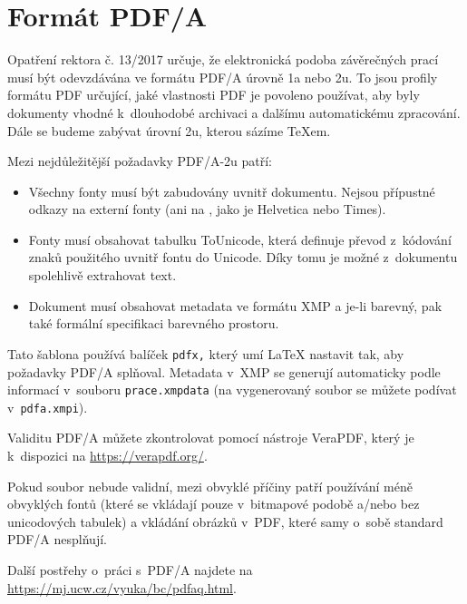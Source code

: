 
\chapter{Formát PDF/A}

Opatření rektora č. 13/2017 určuje, že elektronická podoba závěrečných
prací musí být odevzdávána ve formátu PDF/A úrovně 1a nebo 2u. To jsou
profily formátu PDF určující, jaké vlastnosti PDF je povoleno používat,
aby byly dokumenty vhodné k~dlouhodobé archivaci a dalšímu automatickému
zpracování. Dále se budeme zabývat úrovní 2u, kterou sázíme \TeX{}em.

Mezi nejdůležitější požadavky PDF/A-2u patří:

\begin{itemize}

\item Všechny fonty musí být zabudovány uvnitř dokumentu. Nejsou přípustné
odkazy na externí fonty (ani na , jako je Helvetica nebo Times).

\item Fonty musí obsahovat tabulku ToUnicode, která definuje převod z~kódování
znaků použitého uvnitř fontu do Unicode. Díky tomu je možné z~dokumentu
spolehlivě extrahovat text.

\item Dokument musí obsahovat metadata ve formátu XMP a je-li barevný,
pak také formální specifikaci barevného prostoru.

\end{itemize}

Tato šablona používá balíček {\tt pdfx,} který umí \LaTeX{} nastavit tak,
aby požadavky PDF/A splňoval. Metadata v~XMP se generují automaticky podle
informací v~souboru {\tt prace.xmpdata} (na vygenerovaný soubor se můžete
podívat v~{\tt pdfa.xmpi}).

Validitu PDF/A můžete zkontrolovat pomocí nástroje VeraPDF, který je
k~dispozici na \url{https://verapdf.org/}.

Pokud soubor nebude validní, mezi obvyklé příčiny patří používání méně
obvyklých fontů (které se vkládají pouze v~bitmapové podobě a/nebo bez
unicodových tabulek) a vkládání obrázků v~PDF, které samy o~sobě standard
PDF/A nesplňují.

Další postřehy o~práci s~PDF/A najdete na \url{https://mj.ucw.cz/vyuka/bc/pdfaq.html}.
